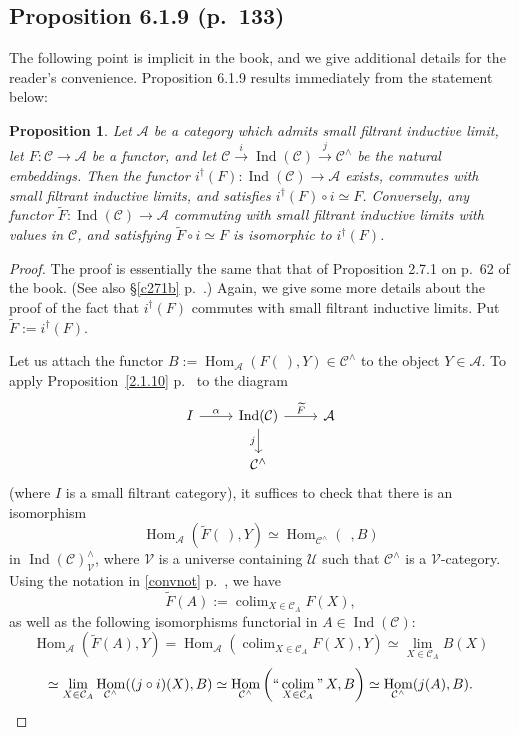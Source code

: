 \documentclass[12pt]{article}
\newtheorem{prop}[thm]{Proposition}
\theoremstyle{remark}
\theoremstyle{definition}
\newcommand{\A}{\mathcal A}
\newcommand{\C}{\mathcal C}
\newcommand{\U}{\mathcal U}
\newcommand{\V}{\mathcal V}
\DeclareMathOperator*{\coli}{colim}
\DeclareMathOperator*{\icolim}{``\coli"}
\DeclareMathOperator{\Hom}{Hom}%
\DeclareMathOperator{\Ind}{Ind}
\begin{document}
\subsection{Proposition 6.1.9 (p.~133)}\label{619}
%
The following point is implicit in the book, and we give additional details for the reader's convenience. Proposition 6.1.9 results immediately from the statement below:
%
\begin{prop} 
Let $\A$ be a category which admits small filtrant inductive limit, let $F:\C\to\A$ be a functor, and let $\C\overset{i}{\to}\Ind(\C)\overset{j}{\to}\C^\wedge$ be the natural embeddings. Then the functor $i^\dagger(F):\Ind(\C)\to\A$ exists, commutes with small filtrant inductive limits, and satisfies $i^\dagger(F)\circ i\simeq F$. Conversely, any functor $\widetilde F:\Ind(\C)\to\A$ commuting with small filtrant inductive limits with values in $\C$, and satisfying $\widetilde F\circ i\simeq F$ is isomorphic to $i^\dagger(F)$. 
\end{prop} 
%
\begin{proof}
The proof is essentially the same that that of Proposition 2.7.1 on p.~62 of the book. (See also \S\ref{c271b} p.~\pageref{c271b}.) Again, we give some more details about the proof of the fact that $i^\dagger(F)$ commutes with small filtrant inductive limits. Put $\widetilde F:=i^\dagger(F)$. 

Let us attach the functor $B:=\Hom_\A(F(\ ),Y)\in\C^\wedge$ to the object $Y\in\A$. To apply Proposition~\ref{2.1.10} p.~\pageref{2.1.10} to the diagram 
$$
\begin{tikzcd}
I\ar{r}{\alpha}&\Ind(\C)\ar{d}[swap]{j}\ar{r}{\widetilde F}&\A\\
&\C^\wedge
\end{tikzcd}
$$
(where $I$ is a small filtrant category), it suffices to check that there is an isomorphism 
$$
\Hom_\A\left(\widetilde F(\ ),Y\right)\simeq
\Hom_{\C^\wedge}(\ \ ,B)
$$ 
in $\Ind(\C)^\wedge_\V$, where $\V$ is a universe containing $\U$ such that $\C^\wedge$ is a $\V$-category. Using the notation in \eqref{convnot} p.~\pageref{convnot}, we have 
$$
\widetilde F(A):=\coli_{X\in\C_A}F(X),
$$ 
as well as the following isomorphisms functorial in $A\in\Ind(\C)$:
$$
\Hom_\A\left(\widetilde F(A),Y\right)=
\Hom_\A\left(\coli_{X\in\C_A}F(X),Y\right)\simeq
\lim_{X\in\C_A}B(X)
$$
$$
\simeq
\lim_{X\in\C_A}\Hom_{\C^\wedge}((j\circ i)(X),B)
\simeq
\Hom_{\C^\wedge}\left(\icolim_{X\in\C_A}X,B\right)\simeq
\Hom_{\C^\wedge}(j(A),B).
$$
\end{proof}
\end{document}
